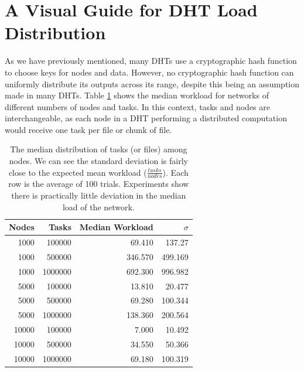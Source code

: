 \documentclass[10pt,conference]{IEEEtran}
\begin{document}
\section{A Visual Guide for DHT Load Distribution }

As we have previously mentioned, many DHTs use a cryptographic hash function to choose keys for nodes and data.
However, no cryptographic hash function can uniformly distribute its outputs across its range, despite this being an assumption made in many DHTs. 
Table \ref{tab:medianLoads} shows the median workload for networks of different numbers of nodes and tasks.
In this context, tasks and nodes are interchangeable, as each node in a DHT performing a distributed computation would receive one task per file or chunk of file.


\begin{table}
	\centering
	\caption{The median distribution of tasks (or files) among nodes.  We can see the standard deviation is fairly close to the expected mean workload ($\frac{tasks}{nodes}$). Each row is the average of 100 trials.  Experiments show there is practically little deviation in the median load of the network.}
	\begin{tabular}{r r r r}
		Nodes & Tasks & Median Workload & $\sigma$ \\ \hline
		1000 & 100000 & 69.410   &  137.27  \\
		1000 & 500000 & 346.570  &  499.169 \\
		1000 & 1000000 & 692.300  &  996.982 \\
		
		5000 & 100000  & 13.810 & 20.477 \\ 
		5000 & 500000  & 69.280 & 100.344 \\ 
		5000 & 1000000 &138.360 & 200.564 \\ 
		
		10000 & 100000 & 7.000   &  10.492 \\
		10000 & 500000 & 34.550  &   50.366 \\
		10000 & 1000000& 69.180  &  100.319 \\
		
		
	\end{tabular}

	\label{tab:medianLoads}
\end{table}
\end{document}
